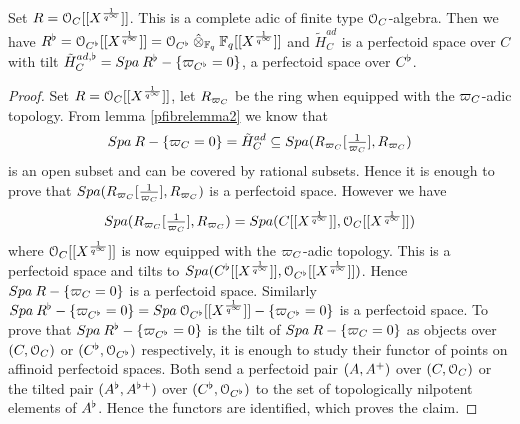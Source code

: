 \begin{prop}\label{punitdiskfibre}
Set $R=\mathcal{O}_C[[X^{\frac{1}{q^\infty}}]]$. This is a complete adic of finite type $\mathcal{O}_C$-algebra.
Then we have $R^{\flat} = \mathcal{O}_{C^{\flat}}[[X^{\frac{1}{q^\infty}}]] =  \mathcal{O}_{C^{\flat}}\mathbin{\hat{\otimes}}_{\mathbb{F}_q}\mathbb{F}_q[[X^{\frac{1}{q^\infty}}]]$ and
$\tilde{H}^{ad}_{C}$ is a perfectoid space over $C$ with tilt $\tilde{H}^{ad, \flat}_{C} = {Spa{\:R^{\flat}}}-\{\varpi_{C^{\flat}}=0\}$, a perfectoid space over $C^{\flat}$.
\end{prop}
\begin{proof}
Set $R=\mathcal{O}_C[[X^{\frac{1}{q^\infty}}]]$, let $R_{\varpi_C}$ be the ring when equipped with the $\varpi_C$-adic topology.
From lemma \ref{pfibrelemma2} we know that 
\[{Spa{\:R}}-\{\varpi_C=0\} = \tilde{H}^{ad}_{C}\subseteq{Spa({R_{\varpi_C}[\tfrac{1}{\varpi_C}]},{R_{\varpi_C}})}\]
is an open subset and can be covered by rational subsets. Hence it is enough to prove that 
${Spa({R_{\varpi_C}[\tfrac{1}{\varpi_C}]},{R_{\varpi_C}})}$
is a perfectoid space. However we have
\[{Spa({R_{\varpi_C}[\tfrac{1}{\varpi_C}]},{R_{\varpi_C}})} = {Spa({C[[X^{\frac{1}{q^\infty}}]]},{\mathcal{O}_C[[X^{\frac{1}{q^\infty}}]]})}\]
where $\mathcal{O}_C[[X^{\frac{1}{q^\infty}}]]$ is now equipped with the $\varpi_C$-adic topology. This is a perfectoid space and tilts to
${Spa({C^{\flat}[[X^{\frac{1}{q^\infty}}]]},{\mathcal{O}_{C^{\flat}}[[X^{\frac{1}{q^\infty}}]]})}$.
Hence ${Spa{\:R}}-\{\varpi_C=0\}$ is a perfectoid space. Similarly ${Spa{\:R^{\flat}}}-\{\varpi_{C^{\flat}}=0\} = {Spa{\:\mathcal{O}_{C^{\flat}}[[X^{\frac{1}{q^\infty}}]]}}-\{\varpi_{C^{\flat}}=0\}$ is a perfectoid space.
To prove that ${Spa{\:R^{\flat}}}-\{\varpi_{C^{\flat}}=0\}$ is the tilt of ${Spa{\:R}}-\{\varpi_C=0\}$ as objects over $(C, \mathcal{O}_C)$ or $(C^{\flat}, \mathcal{O}_{C^{\flat}})$ respectively, it is enough to study their functor of points on affinoid perfectoid spaces. Both send a perfectoid pair $(A,A{^{+}})$ over $(C, \mathcal{O}_C)$ or the tilted pair $(A^{\flat}, A^{\flat}{^{+}})$ over $(C^{\flat}, \mathcal{O}_{C^{\flat}})$ to the set of topologically nilpotent elements of $A^{\flat}$. Hence the functors are identified, which proves the claim.

\end{proof}

